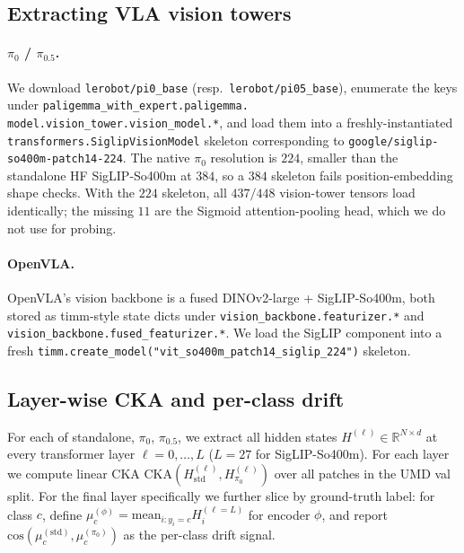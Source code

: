 \documentclass[10pt]{article}
\begin{document}
\subsection{Extracting VLA vision towers}

\paragraph{$\pi_0$ / $\pi_{0.5}$.} We download
\texttt{lerobot/pi0\_base} (resp.\ \texttt{lerobot/pi05\_base}), enumerate the
keys under
\texttt{paligemma\_with\_expert.paligemma.\\model.vision\_tower.vision\_model.*},
and load them into a freshly-instantiated
\texttt{transformers.SiglipVisionModel} skeleton corresponding to
\texttt{google/siglip-so400m-patch14-224}. The native $\pi_0$ resolution is
$224$, smaller than the standalone HF SigLIP-So400m at $384$, so a $384$
skeleton fails position-embedding shape checks. With the $224$ skeleton, all
$437/448$ vision-tower tensors load identically; the missing $11$ are the
Sigmoid attention-pooling head, which we do not use for probing.

\paragraph{OpenVLA.} OpenVLA's vision backbone is a fused
DINOv2-large + SigLIP-So400m, both stored as timm-style state dicts under
\texttt{vision\_backbone.featurizer.*} and
\texttt{vision\_backbone.fused\_featurizer.*}. We load the SigLIP component
into a fresh \texttt{timm.create\_model("vit\_so400m\_patch14\_siglip\_224")}
skeleton.

\subsection{Layer-wise CKA and per-class drift}

For each of standalone, $\pi_0$, $\pi_{0.5}$, we extract all hidden states
$H^{(\ell)} \in \mathbb{R}^{N \times d}$ at every transformer layer
$\ell = 0, \dots, L$ ($L = 27$ for SigLIP-So400m). For each layer we compute
linear CKA $\mathrm{CKA}(H_\text{std}^{(\ell)}, H_{\pi_0}^{(\ell)})$ over all
patches in the UMD val split. For the final layer specifically we further
slice by ground-truth label: for class $c$, define
$\mu_c^{(\phi)} = \mathrm{mean}_{i: y_i = c} H^{(\ell=L)}_i$ for encoder
$\phi$, and report $\mathrm{cos}(\mu_c^{(\text{std})}, \mu_c^{(\pi_0)})$ as
the per-class drift signal.
\end{document}
